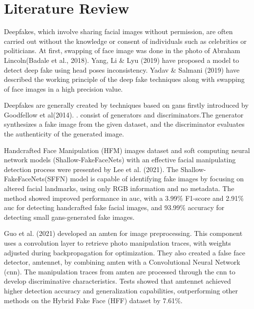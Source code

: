 \chapter{Literature Review}
Deepfakes, which involve sharing facial images without permission, are often carried out without the knowledge or consent of individuals such as celebrities or politicians. At first, swapping of face image was done in the photo of Abraham Lincoln(Badale et al., 2018)\cite{badale2018deep}. Yang, Li \& Lyu (2019)\cite{yang2019exposing} have proposed a model to detect deep fake using head poses inconsistency. Yadav \& Salmani (2019)\cite{yadav2019deepfake} have described the working principle of the deep fake techniques along with swapping of face images in a high precision value.

Deepfakes are generally created by techniques based on
\acrfull*{gans} firstly introduced
by Goodfellow et al(2014). \cite{goodfellow2014generative}.  consist of generators and discriminators.The generator synthesizes a fake image from the given dataset, and the discriminator evaluates the authenticity of the generated image.

Handcrafted Face Manipulation (HFM) images dataset and soft computing neural network models (Shallow-FakeFaceNets) with an effective facial manipulating detection process were presented by Lee et al. (2021)\cite{lee2021detecting}. The Shallow-FakeFaceNets(SFFN) model is capable of identifying fake images by focusing on altered facial landmarks, using only RGB information and no metadata. The method showed improved performance in \acrfull{auc}, with a 3.99\% F1-score and 2.91\% \acrshort{auc} for detecting handcrafted fake facial images, and 93.99\% accuracy for detecting small \acrshort*{gans}-generated fake images.

Guo et al. (2021)\cite{guo2021fake} developed an \acrfull*{amten} for image preprocessing. This component uses a convolution layer to retrieve photo manipulation traces, with weights adjusted during backpropagation for optimization. They also created a false face detector, \acrshort{amten}net, by combining \acrshort{amten} with a Convolutional Neural Network (\acrshort{cnn}). The manipulation traces from \acrshort{amten} are processed through the \acrshort{cnn} to develop discriminative characteristics. Tests showed that \acrshort{amten}net achieved higher detection accuracy and generalization capabilities, outperforming other methods on the Hybrid Fake Face (HFF) dataset by 7.61\%.

